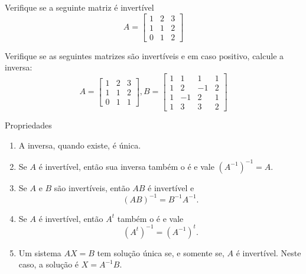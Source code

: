 \begin{frame}[label=inversao]


\begin{exer}
Verifique se a seguinte matriz é invertível
\[
A=\begin{bmatrix}
1 & 2 & 3\\ 1 & 1 & 2 \\ 0& 1 & 2
\end{bmatrix}
\] 
\end{exer}

\end{frame}


\begin{frame}[label=inversao]


\begin{casa}
Verifique se as seguintes matrizes são invertíveis e em caso positivo, calcule a inversa:
\[
A=\begin{bmatrix}
1 & 2 & 3\\ 1 & 1 & 2 \\ 0 & 1 & 1  
\end{bmatrix},
B=\begin{bmatrix}
1 & 1 & 1 & 1\\ 1 & 2 & -1 & 2 \\ 1 & -1 & 2 &  1\\ 1& 3 & 3& 2 
\end{bmatrix}
\] 
\end{casa}

\end{frame}

\begin{frame}[label=inversao]
\begin{block}{Propriedades}
\begin{enumerate}
\item A inversa, quando existe, é única.

\item Se $A$ é invertível, então sua inversa também o é e vale $(A^{-1})^{-1}=A$.

\item Se $A$ e $B$ são invertíveis, então $AB$ é invertível e
\[(AB)^{-1}=B^{-1}A^{-1}. \]

\item Se $A$ é invertível, então $A^t$ também o é e vale
\[(A^t)^{-1}=(A^{-1})^t.\]

\item Um sistema $AX=B$ tem solução única se, e somente se, $A$ é invertível. Neste caso, a solução é $X=A^{-1}B$.
\end{enumerate}

\end{block}

\end{frame}


